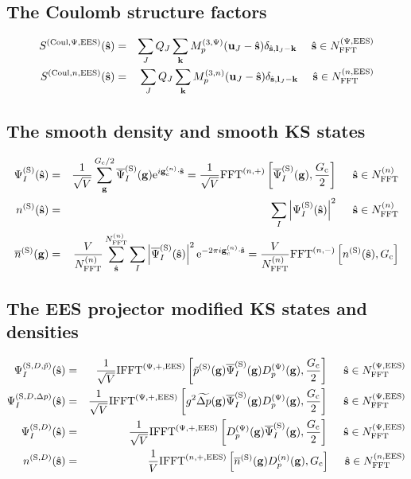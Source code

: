\documentclass[paper=a4, fontsize=11pt]{article} %
\numberwithin{equation}{section} %
\numberwithin{figure}{section} %
\numberwithin{table}{section} %
\newcommand{\wt}{\widetilde}
\newcommand{\ol}{\overline}
\newcommand{\bu}{{\bf{u}}}
\newcommand{\bl}{{\bf{l}}}
\newcommand{\bk}{{\bf{k}}}
\newcommand{\bs}{{\bf{s}}}
\newcommand{\bg}{{\bf{g}}}
\newcommand{\hs}{{\hat{\bf{s}}}}
\newcommand{\rS}{{\mathrm{S}}}
\newcommand{\rEES}{{\mathrm{EES}}}
\newcommand{\re}{{\mathrm{e}}}
\newcommand{\rCo}{{\mathrm{Coul}}}
\newcommand{\gcn}{{\bg_c^{(n)}}}
\newcommand{\igcns}{2\pi i\gcn\cdot\hat \bs}
\newcommand{\psigs}{{\overline \Psi_I^{(\rS)}(\bg)}}
\newcommand{\NFFTn}{{N^{(n)}_{\mathrm{FFT}}}}
\newcommand{\NFFTnEES}{{N^{(n,\rEES)}_{\mathrm{FFT}}}}
\newcommand{\NFFTpEES}{{N^{\mathrm{(\Psi,\rEES})}_{\mathrm{FFT}}}}
\newcommand{\Gc}{{G_{\mathrm{c}}}}
\newcommand{\hGc}{{\frac{G_{\mathrm{c}}}{2}}}
\newcommand{\Dpg}{{D^{(\Psi)}_p(\bg)}}
\newcommand{\Mn}{{M_p^{(3,n)}}}
\newcommand{\Mp}{{M_p^{(3,\Psi)}}}
\newcommand{\IFFTnEES}{{\mathrm{IFFT}^{(n,+,\rEES)}}}
\newcommand{\IFFTpEES}{{\mathrm{IFFT}^{(\Psi,+,\rEES)}}}
\newcommand{\FFTni}{{\mathrm{FFT}^{(n,-)}}}
\newcommand{\hsinpEES}{{\ \ \ \ \hs \in \NFFTpEES}}
\newcommand{\hsinnEES}{{\ \ \ \ \hs \in \NFFTnEES}}
\newcommand{\hsinn}{{\ \ \ \ \hs \in \NFFTn}}
\begin{document}
\subsection{The Coulomb structure factors}
\begin{eqnarray}
\label{gr:SpEES}
S^{(\rCo,\Psi,\rEES)}(\hat \bs)
&=&\sum_J Q_J \sum_{\bk} \Mp(\bu_{J}-\hat \bs)\delta_{\hat \bs,\bl_J-\bk} \hsinpEES\\
\label{gr:SnEES}
S^{(\rCo,n,\rEES)}(\hat \bs)
&=&\sum_J Q_J \sum_{\bk} \Mn(\bu_{J}-\hat \bs)\delta_{\hat \bs,\bl_J-\bk} \hsinnEES
\end{eqnarray}

\subsection{The smooth density and smooth KS states}
\begin{eqnarray}
\label{gr:PsiSs}
\Psi_I^{(\rS)}(\hs) &=&\frac{1}{\sqrt{V}}\sum_\bg^{\Gc/2} \overline{\Psi}^{(\rS)}_I(\bg)  \re^{i \bg_c^{(n)}\cdot \hs} = \frac{1}{\sqrt{V}} \mathrm{FFT}^{(n,+)}\left[\ol \Psi_I^{(\rS)}(\bg), \hGc\right] \hsinn\\
n^{(\rS)}(\hat \bs)
&=& \sum_I \left|\Psi_I^{(\rS)}(\hat \bs) \right|^2 \hsinn\\
\label{gr:nSg}
\overline{n}^{(\rS)}(\bg) 
&=& \frac{V}{\NFFTn}\sum_{\hat\bs}^{\NFFTn}  \sum_I \left| \overline \Psi_I^{(\rS)}(\hat \bs) \right|^2  \re^{-\igcns} = \frac{V}{\NFFTn} \FFTni \left[n^{(\rS)}(\hat \bs),\Gc\right]
\end{eqnarray}

\subsection{The EES projector modified KS states and densities}
\begin{eqnarray}
\label{Psi:ssDp}
\Psi_I^{(\rS,D,\tilde p)}(\hs)
&=&\frac{1}{\sqrt{V}}\IFFTpEES \left[ \tilde p^{(\rS)}(\bg)\psigs \Dpg,\hGc\right] \hsinpEES\\
\label{Psi:ssDKE}
\Psi_I^{(\rS,D,\Delta p)}(\hs)
&=&\frac{1}{\sqrt{V}}\IFFTpEES \left[ g^2 \wt {\Delta p} (\bg) \psigs \Dpg ,\hGc\right] \hsinpEES\\
\Psi_I^{(\rS,D)}(\hat \bs) &=& \frac{1}{\sqrt V} \IFFTpEES \left[  \Dpg \psigs,\hGc \right] \hsinpEES\\
\label{gr:nSDs}
n^{(\rS,D)}(\hs) &=& \frac{1}{V} \IFFTnEES \left[ \ol n^{(\rS)}(\bg) D^{(n)}_p(\bg) ,\Gc\right] \hsinnEES
\end{eqnarray}
\end{document}
